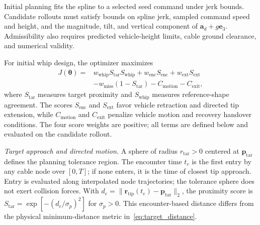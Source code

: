 \documentclass[letterpaper, 10 pt, conference]{ieeeconf}
\begin{document}
Initial planning fits the spline to a selected seed command under
jerk bounds. Candidate rollouts must satisfy bounds on spline jerk,
sampled command speed and height, and the magnitude, tilt, and
vertical component of $\mathbf a_d+g\mathbf e_3$.
Admissibility also requires predicted vehicle-height limits,
cable ground clearance, and numerical validity.

For initial whip design, the optimizer maximizes
\begin{equation}
\begin{aligned}
J(\boldsymbol\theta)
={}&w_{\mathrm{whip}}S_{\mathrm{tar}}S_{\mathrm{whip}}
+w_{\mathrm{enc}}S_{\mathrm{enc}}+w_{\mathrm{ext}}S_{\mathrm{ext}}\\
&-w_{\mathrm{miss}}(1-S_{\mathrm{tar}})
-C_{\mathrm{motion}}-C_{\mathrm{exit}},
\end{aligned}
\label{eq:planning_score}
\end{equation}
where $S_{\mathrm{tar}}$ measures target proximity and $S_{\mathrm{whip}}$
measures reference-shape agreement. The scores $S_{\mathrm{enc}}$
and $S_{\mathrm{ext}}$ favor vehicle retraction and directed tip
extension, while $C_{\mathrm{motion}}$ and $C_{\mathrm{exit}}$
penalize vehicle motion and recovery handover conditions.
The four score weights are positive; all terms are defined below
and evaluated on the candidate rollout.

\noindent\emph{Target approach and directed motion.}
A sphere of radius $r_{\mathrm{tar}}>0$ centered at
$\mathbf p_{\mathrm{tar}}$ defines the planning tolerance region.
The encounter time $t_e$ is the first entry by any cable node
over $[0,T]$; if none enters, it is the time of closest tip
approach. Entry is evaluated along interpolated node trajectories;
the tolerance sphere does not exert collision forces. With
$d_e=\|\mathbf r_{\mathrm{tip}}(t_e)-\mathbf p_{\mathrm{tar}}\|_2$,
the proximity score is $S_{\mathrm{tar}}=\exp[-(d_e/\sigma_p)^2]$ for
$\sigma_p>0$. This encounter-based distance differs from the
physical minimum-distance metric in~\eqref{eq:target_distance}.
\end{document}
